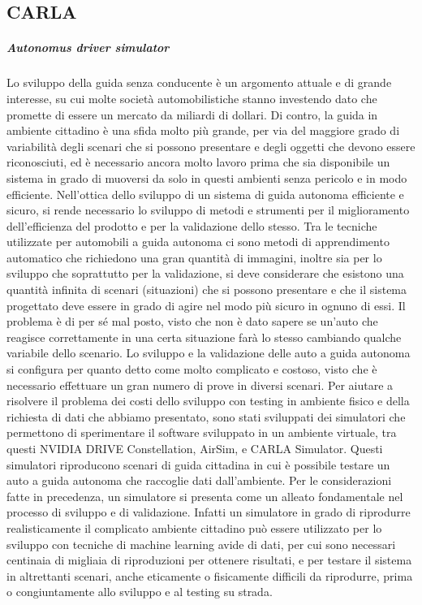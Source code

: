 \documentclass[14pt]{extarticle}
\begin{document}
\subsection{CARLA}
\subparagraph{Autonomus driver simulator}
Lo sviluppo della guida senza conducente è un argomento attuale e di
grande interesse, su cui molte società automobilistiche stanno investendo
dato che promette di essere un mercato da miliardi di dollari. %
Di contro, la guida in ambiente cittadino è una sfida
molto più grande, per via del maggiore grado di variabilità degli scenari
che si possono presentare e degli oggetti che devono essere riconosciuti,
ed è necessario ancora molto lavoro prima che sia disponibile un sistema
in grado di muoversi da solo in questi ambienti senza pericolo e in modo
efficiente.
Nell'ottica dello sviluppo di un sistema di guida autonoma efficiente
e sicuro, si rende necessario lo sviluppo di metodi e strumenti per il
miglioramento dell'efficienza del prodotto e per la validazione dello
stesso. Tra le tecniche utilizzate per automobili a guida autonoma ci sono
metodi di apprendimento automatico che richiedono una gran quantità di
immagini, inoltre sia per lo sviluppo che soprattutto per la validazione, si
deve considerare che esistono una quantità infinita di scenari (situazioni)
che si possono presentare e che il sistema progettato deve essere in grado
di agire nel modo più sicuro in ognuno di essi. Il problema è di per sé mal
posto, visto che non è dato sapere se un'auto che reagisce correttamente
in una certa situazione farà lo stesso cambiando qualche variabile dello
scenario.
Lo sviluppo e la validazione delle auto a guida autonoma si configura
per quanto detto come molto complicato e costoso, visto che è necessario
effettuare un gran numero di prove in diversi scenari.
Per aiutare a risolvere il problema dei costi dello sviluppo con testing
in ambiente fisico e della richiesta di dati che abbiamo presentato, sono
stati sviluppati dei simulatori che permettono di sperimentare il software
sviluppato in un ambiente virtuale, tra questi NVIDIA DRIVE Constellation, AirSim, e CARLA Simulator. Questi simulatori riproducono scenari di guida cittadina
in cui è possibile testare un auto a guida autonoma che raccoglie dati
dall'ambiente. Per le considerazioni fatte in precedenza, un simulatore
si presenta come un alleato fondamentale nel processo di sviluppo e di
validazione. Infatti un simulatore in grado di riprodurre realisticamente
il complicato ambiente cittadino può essere utilizzato per lo sviluppo
con tecniche di machine learning avide di dati, per cui sono necessari
centinaia di migliaia di riproduzioni per ottenere risultati, e per testare il
sistema in altrettanti scenari, anche eticamente o fisicamente difficili da
riprodurre, prima o congiuntamente allo sviluppo e al testing su strada.
\end{document}
